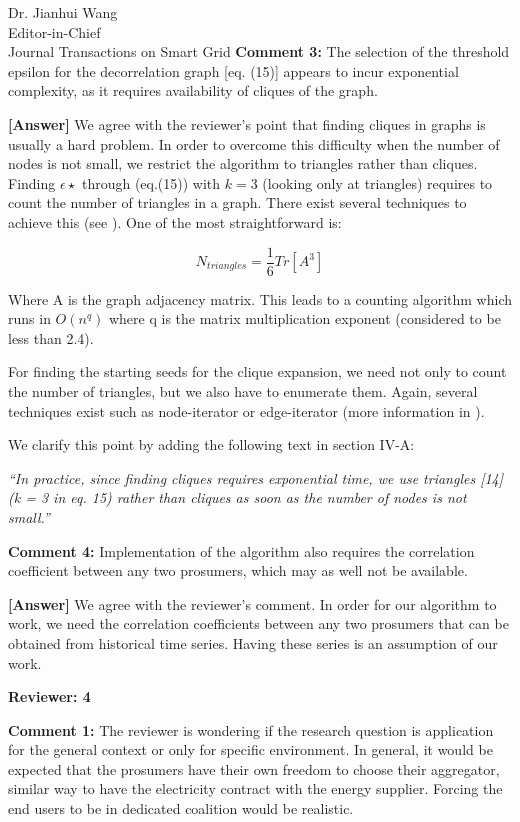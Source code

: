 \documentclass{letter}
\begin{document}
\begin{letter}{Dr. Jianhui Wang \\ Editor-in-Chief \\ Journal Transactions on Smart Grid }
\textbf{Comment 3:} The selection of the threshold epsilon for the decorrelation graph [eq. (15)] appears to incur exponential complexity, as it requires availability of cliques of the graph.


\textbf{[Answer]} We agree with the reviewer’s point that finding cliques in graphs is usually a hard problem. In order to overcome this difficulty when the number of nodes is not small, we restrict the algorithm to triangles rather than cliques. Finding $ \epsilon{\star} $ through (eq.(15)) with $ k = 3 $ (looking only at triangles) requires to count the number of triangles in a graph. There exist several techniques to achieve this (see \cite{Schank2001}). One of the most straightforward is:

\begin{equation}
 N_{triangles} = \frac{1}{6} Tr \left[ A^3 \right] 
\end{equation}
 
Where A is the graph adjacency matrix. This leads to a counting algorithm which runs in $ O(n^q) $ where q is the matrix multiplication exponent (considered to be less than 2.4).

For finding the starting seeds for the clique expansion, we need not only to count the number of triangles, but we also have to enumerate them. Again, several techniques exist such as node-iterator or edge-iterator (more information in \cite{Schank2001}). 

We clarify this point by adding the following text in section IV-A:

\textit{“In practice, since finding cliques requires exponential time, we use triangles [14] (k = 3 in eq. 15) rather than cliques as soon as the number of nodes is not small.” }


\textbf{Comment 4:} Implementation of the algorithm also requires the correlation coefficient between any two prosumers, which may as well not be available.


\textbf{[Answer]} We agree with the reviewer’s comment. In order for our algorithm to work, we need the correlation coefficients between any two prosumers that can be obtained from historical time series. Having these series is an assumption of our work.


\textbf{Reviewer: 4}

\textbf{Comment 1:} The reviewer is wondering if the research question is application for the general context or only for specific environment. In general, it would be expected that the prosumers have their own freedom to choose their aggregator, similar way to have the electricity contract with the energy supplier. Forcing the end users to be in dedicated coalition would be realistic.



\end{letter}
\end{document}
